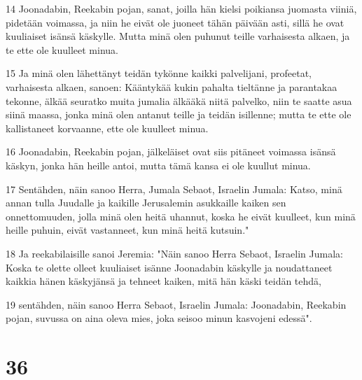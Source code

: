 \par 14 Joonadabin, Reekabin pojan, sanat, joilla hän kielsi poikiansa juomasta viiniä, pidetään voimassa, ja niin he eivät ole juoneet tähän päivään asti, sillä he ovat kuuliaiset isänsä käskylle. Mutta minä olen puhunut teille varhaisesta alkaen, ja te ette ole kuulleet minua.
\par 15 Ja minä olen lähettänyt teidän tykönne kaikki palvelijani, profeetat, varhaisesta alkaen, sanoen: Kääntykää kukin pahalta tieltänne ja parantakaa tekonne, älkää seuratko muita jumalia älkääkä niitä palvelko, niin te saatte asua siinä maassa, jonka minä olen antanut teille ja teidän isillenne; mutta te ette ole kallistaneet korvaanne, ette ole kuulleet minua.
\par 16 Joonadabin, Reekabin pojan, jälkeläiset ovat siis pitäneet voimassa isänsä käskyn, jonka hän heille antoi, mutta tämä kansa ei ole kuullut minua.
\par 17 Sentähden, näin sanoo Herra, Jumala Sebaot, Israelin Jumala: Katso, minä annan tulla Juudalle ja kaikille Jerusalemin asukkaille kaiken sen onnettomuuden, jolla minä olen heitä uhannut, koska he eivät kuulleet, kun minä heille puhuin, eivät vastanneet, kun minä heitä kutsuin."
\par 18 Ja reekabilaisille sanoi Jeremia: "Näin sanoo Herra Sebaot, Israelin Jumala: Koska te olette olleet kuuliaiset isänne Joonadabin käskylle ja noudattaneet kaikkia hänen käskyjänsä ja tehneet kaiken, mitä hän käski teidän tehdä,
\par 19 sentähden, näin sanoo Herra Sebaot, Israelin Jumala: Joonadabin, Reekabin pojan, suvussa on aina oleva mies, joka seisoo minun kasvojeni edessä".

\chapter{36}

